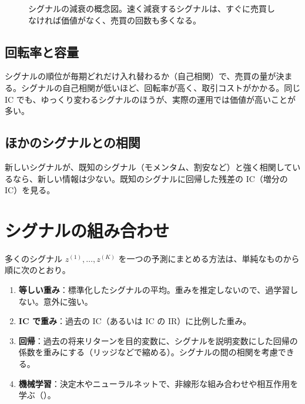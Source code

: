 \begin{figure}[H]
\centering
{}
\caption{シグナルの減衰の概念図。速く減衰するシグナルは、すぐに売買しなければ価値がなく、売買の回数も多くなる。}
\label{fig:decay}
\end{figure}

\subsection{回転率と容量}

シグナルの順位が毎期どれだけ入れ替わるか（自己相関）で、売買の量が決まる。シグナルの自己相関が低いほど、回転率が高く、取引コストがかかる。同じ IC でも、ゆっくり変わるシグナルのほうが、実際の運用では価値が高いことが多い。

\subsection{ほかのシグナルとの相関}

新しいシグナルが、既知のシグナル（モメンタム、割安など）と強く相関しているなら、新しい情報は少ない。既知のシグナルに回帰した残差の IC（増分の IC）を見る。

\section{シグナルの組み合わせ}

多くのシグナル $z^{(1)}, \dots, z^{(K)}$ を一つの予測にまとめる方法は、単純なものから順に次のとおり。

\begin{enumerate}
\item \textbf{等しい重み}：標準化したシグナルの平均。重みを推定しないので、過学習しない。意外に強い。
\item \textbf{IC で重み}：過去の IC（あるいは IC の IR）に比例した重み。
\item \textbf{回帰}：過去の将来リターンを目的変数に、シグナルを説明変数にした回帰の係数を重みにする（リッジなどで縮める）。シグナルの間の相関を考慮できる。
\item \textbf{機械学習}：決定木やニューラルネットで、非線形な組み合わせや相互作用を学ぶ（）。
\end{enumerate}

